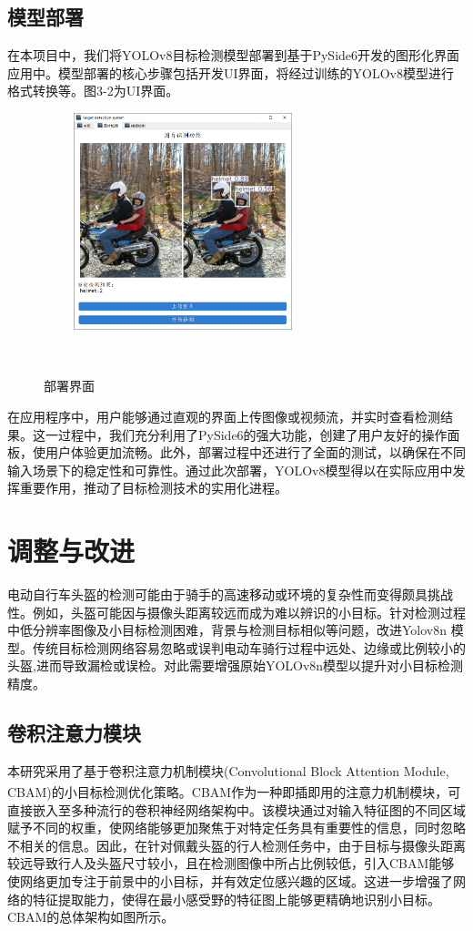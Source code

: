 \documentclass[journal]{IEEEtran}
\numberwithin{figure}{section}%
\numberwithin{table}{section}%
\numberwithin{equation}{section}
\begin{document}
\subsection{模型部署}
在本项目中，我们将YOLOv8目标检测模型部署到基于PySide6开发的图形化界面应用中。模型部署的核心步骤包括开发UI界面，将经过训练的YOLOv8模型进行格式转换等。图3-2为UI界面。\par
\begin{figure}[htbp] 

   \centering
   \includegraphics[width=2.5in]{figures/部署页面.png}
   \caption{部署界面} 
   \label{fig:} 
  
\end{figure} 
在应用程序中，用户能够通过直观的界面上传图像或视频流，并实时查看检测结果。这一过程中，我们充分利用了PySide6的强大功能，创建了用户友好的操作面板，使用户体验更加流畅。此外，部署过程中还进行了全面的测试，以确保在不同输入场景下的稳定性和可靠性。通过此次部署，YOLOv8模型得以在实际应用中发挥重要作用，推动了目标检测技术的实用化进程。\par
\setcounter{equation}{0}

\section{调整与改进}
电动自行车头盔的检测可能由于骑手的高速移动或环境的复杂性而变得颇具挑战性。例如，头盔可能因与摄像头距离较远而成为难以辨识的小目标。针对检测过程中低分辨率图像及小目标检测困难，背景与检测目标相似等问题，改进Yolov8n 模型。传统目标检测网络容易忽略或误判电动车骑行过程中远处、边缘或比例较小的头盔,进而导致漏检或误检。对此需要增强原始YOLOv8n模型以提升对小目标检测精度。\par
\subsection{卷积注意力模块}
本研究采用了基于卷积注意力机制模块(Convolutional Block Attention Module, CBAM)\textsuperscript{\cite{1}}的小目标检测优化策略。CBAM作为一种即插即用的注意力机制模块，可直接嵌入至多种流行的卷积神经网络架构中。该模块通过对输入特征图的不同区域赋予不同的权重，使网络能够更加聚焦于对特定任务具有重要性的信息，同时忽略不相关的信息。因此，在针对佩戴头盔的行人检测任务中，由于目标与摄像头距离较远导致行人及头盔尺寸较小，且在检测图像中所占比例较低，引入CBAM能够使网络更加专注于前景中的小目标，并有效定位感兴趣的区域。这进一步增强了网络的特征提取能力，使得在最小感受野的特征图上能够更精确地识别小目标。CBAM的总体架构如图所示。\par
\end{document}
